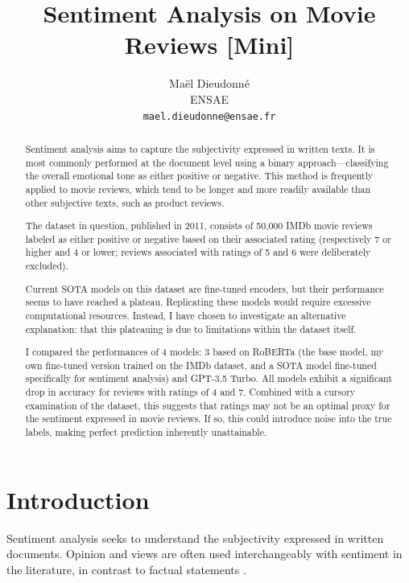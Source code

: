 \documentclass{article}
\title{Sentiment Analysis on Movie Reviews [Mini]}
\author{
  Maël Dieudonné\\
  ENSAE\\
  \texttt{mael.dieudonne@ensae.fr} \\
}
\begin{document}
\maketitle

\begin{abstract}
Sentiment analysis aims to capture the subjectivity expressed in written texts. It is most commonly performed at the document level using a binary approach---classifying the overall emotional tone as either positive or negative. This method is frequently applied to movie reviews, which tend to be longer and more readily available than other subjective texts, such as product reviews.

The dataset in question, published in 2011, consists of 50,000 IMDb movie reviews labeled as either positive or negative based on their associated rating (respectively 7 or higher and 4 or lower; reviews associated with ratings of 5 and 6 were deliberately excluded).

Current SOTA models on this dataset are fine-tuned encoders, but their performance seems to have reached a plateau. Replicating these models would require excessive computational resources. Instead, I have chosen to investigate an alternative explanation: that this plateauing is due to limitations within the dataset itself.

I compared the performances of 4 models: 3 based on RoBERTa (the base model, my own fine-tuned version trained on the IMDb dataset, and a SOTA model fine-tuned specifically for sentiment analysis) and GPT-3.5 Turbo. All models exhibit a significant drop in accuracy for reviews with ratings of 4 and 7. Combined with a cursory examination of the dataset, this suggests that ratings may not be an optimal proxy for the sentiment expressed in movie reviews. If so, this could introduce noise into the true labels, making perfect prediction inherently unattainable.
\end{abstract}


\section{Introduction}

Sentiment analysis seeks to understand the subjectivity expressed in written documents. Opinion and views are often used interchangeably with sentiment in the literature, in contrast to factual statements \citep{munezero_are_2014}.
\end{document}
